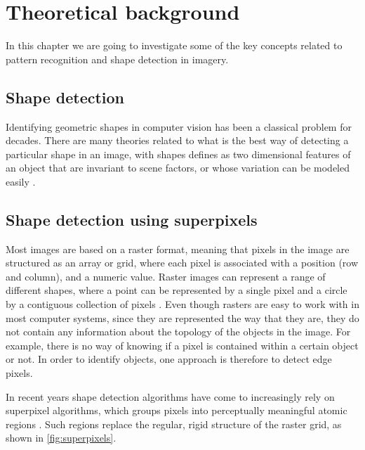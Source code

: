 \chapter{Theoretical background}
In this chapter we are going to investigate some of the key concepts related to pattern recognition and shape detection in imagery. 

\section{Shape detection}
Identifying geometric shapes in computer vision has been a classical problem for decades. There are many theories related to what is the best way of detecting a particular shape in an image, with shapes defines as two dimensional features of an object that are invariant to scene factors, or whose variation can be modeled easily \citep{Moon2002}.

\section{Shape detection using superpixels}
Most images are based on a raster format, meaning that pixels in the image are structured as an array or grid, where each pixel is associated with a position (row and column), and a numeric value. Raster images can represent a range of different shapes, where a point can be represented by a single pixel and a circle by a contiguous collection of pixels \citep{Worboys2003}. Even though rasters are easy to work with in most computer systems, since they are represented the way that they are, they do not contain any information about the topology of the objects in the image. For example, there is no way of knowing if a pixel is contained within a certain object or not. In order to identify objects, one approach is therefore to detect edge pixels.

In recent years shape detection algorithms have come to increasingly rely on superpixel algorithms, which groups pixels into perceptually meaningful atomic regions \citep{Achanta2012}. Such regions replace the regular, rigid structure of the raster grid, as shown in \autoref{fig:superpixels}.

